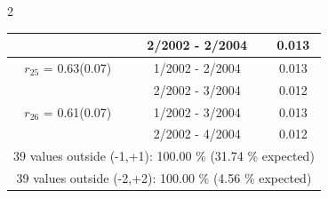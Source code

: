 \begin{multicols}{2}
{\begin{tabular}{ccc}
&        2/2002 -  2/2004 &        0.013  \vspace{-.02in} \\ \hline 
  $r_{25}$ = 0.63(0.07) &       1/2002 -  2/2004 &        0.013   \vspace{-.10in} \\  
&        2/2002 -  3/2004 &        0.012  \vspace{-.02in} \\ \hline 
  $r_{26}$ = 0.61(0.07) &       1/2002 -  3/2004 &        0.013   \vspace{-.10in} \\  
&        2/2002 -  4/2004 &        0.012  \vspace{-.02in} \\ \hline 
\multicolumn{3}{c}{              39 values outside (-1,+1): 100.00  \% (31.74  \% expected)}\vspace{-.10in} \\ 
\multicolumn{3}{c}{              39 values outside (-2,+2): 100.00 \%  (4.56 \% expected) } \\
 \end{tabular} \\ 
 } 
\end{multicols} 
